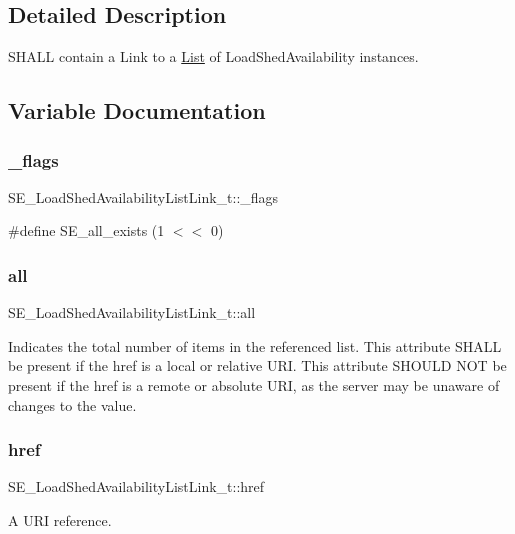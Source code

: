 \subsection{Detailed Description}
S\+H\+A\+LL contain a Link to a \hyperlink{structList}{List} of Load\+Shed\+Availability instances. 

\subsection{Variable Documentation}
\mbox{\label{group__LoadShedAvailabilityListLink_ga15ccf58f6147475c85154f31d26113f7}} 
\subsubsection{\texorpdfstring{\+\_\+flags}{\_flags}}
{\footnotesize\ttfamily S\+E\+\_\+\+Load\+Shed\+Availability\+List\+Link\+\_\+t\+::\+\_\+flags}

\#define S\+E\+\_\+all\+\_\+exists (1 $<$$<$ 0) \mbox{\label{group__LoadShedAvailabilityListLink_gad05e8fa55aae27cf8d5534318a6612c5}} 
\subsubsection{\texorpdfstring{all}{all}}
{\footnotesize\ttfamily S\+E\+\_\+\+Load\+Shed\+Availability\+List\+Link\+\_\+t\+::all}

Indicates the total number of items in the referenced list. This attribute S\+H\+A\+LL be present if the href is a local or relative U\+RI. This attribute S\+H\+O\+U\+LD N\+OT be present if the href is a remote or absolute U\+RI, as the server may be unaware of changes to the value. \mbox{\label{group__LoadShedAvailabilityListLink_gae2e84f55b64ef90ea74bcddce389f77a}} 
\subsubsection{\texorpdfstring{href}{href}}
{\footnotesize\ttfamily S\+E\+\_\+\+Load\+Shed\+Availability\+List\+Link\+\_\+t\+::href}

A U\+RI reference. 